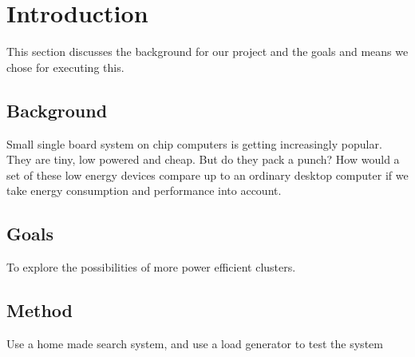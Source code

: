 \clearpage
\section{Introduction}
This section discusses the background for our project and the goals and means we chose for executing this.
\subsection{Background}
Small single board system on chip computers is getting increasingly popular. They are tiny, low powered and cheap. But do they pack a punch?
How would a set of these low energy devices compare up to an ordinary desktop computer if we take energy consumption and performance into account.
\subsection{Goals}
To explore the possibilities of more power efficient clusters.
\subsection{Method}
Use a home made search system, and use a load generator to test the system
